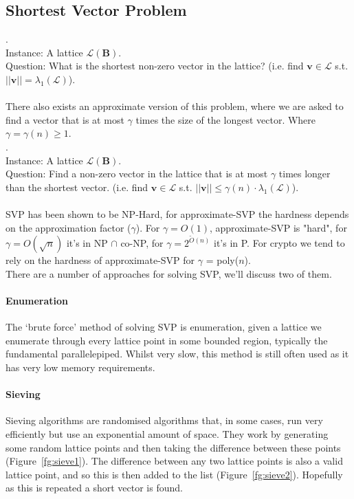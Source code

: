 \documentclass[a4paper, 11pt, openany]{book}
\begin{document}
\subsection{Shortest Vector Problem}
.
\\
Instance: A lattice $\mathcal{L}(\textbf{B})$.
\\
Question: What is the shortest non-zero vector in the lattice? (i.e. find $\textbf{v} \in \mathcal{L}$ s.t. $||\textbf{v}|| = \lambda_1(\mathcal{L})$).
\\
~\\
There also exists an approximate version of this problem, where we are asked to find a vector that is at most $\gamma$ times the size of the longest vector. Where $\gamma = \gamma(n) \geq 1$.
\\
.
\\
Instance: A lattice $\mathcal{L}(\textbf{B})$.
\\
Question: Find a non-zero vector in the lattice that is at most $\gamma$ times longer than the shortest vector. (i.e. find $\textbf{v} \in \mathcal{L}$ s.t. $||\textbf{v}|| \leq \gamma(n)\cdot\lambda_1(\mathcal{L})$).
\\
~\\
SVP has been shown to be NP-Hard, for approximate-SVP the hardness depends on the approximation factor ($\gamma$). For $\gamma = O(1)$, approximate-SVP is "hard", for $\gamma = O(\sqrt{n})$ it's in NP $\cap$ co-NP, for $\gamma = 2^{\tilde{O}(n)}$ it's in P. For crypto we tend to rely on the hardness of approximate-SVP for $\gamma$ = poly($n$).
\\
There are a number of approaches for solving SVP, we'll discuss two of them.
\paragraph{Enumeration} The `brute force' method of solving SVP is enumeration, given a lattice we enumerate through every lattice point in some bounded region, typically the fundamental parallelepiped. Whilst very slow, this method is still often used as it has very low memory requirements.
\paragraph{Sieving} Sieving algorithms are randomised algorithms that, in some cases, run very efficiently but use an exponential amount of space. They work by generating some random lattice points and then taking the difference between these points (Figure~\ref{fg:sieve1}). The difference between any two lattice points is also a valid lattice point, and so this is then added to the list (Figure~\ref{fg:sieve2}). Hopefully as this is repeated a short vector is found.
\end{document}
